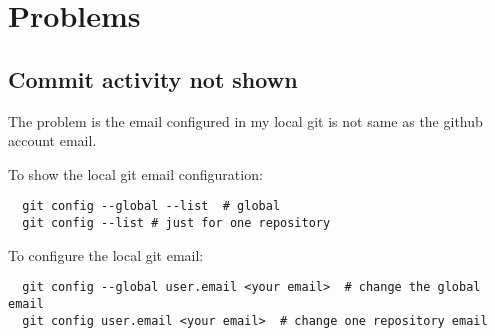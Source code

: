 
\chapter{Problems}

\section{Commit activity not shown}

The problem is the email configured in my local git is not same as the github account email.

To show the local git email configuration:
\begin{lstlisting}
  git config --global --list  # global
  git config --list # just for one repository
\end{lstlisting}


To configure the local git email:
\begin{lstlisting}
  git config --global user.email <your email>  # change the global email
  git config user.email <your email>  # change one repository email
\end{lstlisting}